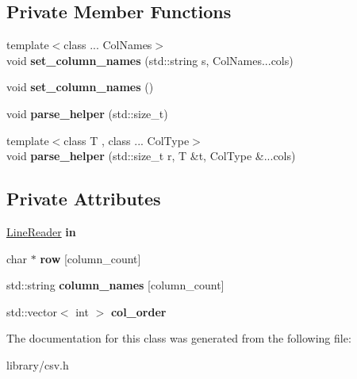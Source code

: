 \subsection*{Private Member Functions}
\begin{DoxyCompactItemize}
\item 
\mbox{\label{classio_1_1CSVReader_af0f3df423977925fd22acadbdbc4cdcd}} 
{\footnotesize template$<$class ... Col\+Names$>$ }\\void {\bfseries set\+\_\+column\+\_\+names} (std\+::string s, Col\+Names...\+cols)
\item 
\mbox{\label{classio_1_1CSVReader_a48a56e02ae597ae3506e1b24dc0718ef}} 
void {\bfseries set\+\_\+column\+\_\+names} ()
\item 
\mbox{\label{classio_1_1CSVReader_ada16395fbaedad5fcda248b50cd12da0}} 
void {\bfseries parse\+\_\+helper} (std\+::size\+\_\+t)
\item 
\mbox{\label{classio_1_1CSVReader_a6e2cb67ff14a62cee48fb9042c1bfff9}} 
{\footnotesize template$<$class T , class ... Col\+Type$>$ }\\void {\bfseries parse\+\_\+helper} (std\+::size\+\_\+t r, T \&t, Col\+Type \&...cols)
\end{DoxyCompactItemize}
\subsection*{Private Attributes}
\begin{DoxyCompactItemize}
\item 
\mbox{\label{classio_1_1CSVReader_a26da3892b5c4606617d9daadc0886501}} 
\hyperlink{classio_1_1LineReader}{Line\+Reader} {\bfseries in}
\item 
\mbox{\label{classio_1_1CSVReader_a48ab5773a4295f7969453838b4115e42}} 
char $\ast$ {\bfseries row} \mbox{[}column\+\_\+count\mbox{]}
\item 
\mbox{\label{classio_1_1CSVReader_a7b97f929cea543f83e61173ea435fdde}} 
std\+::string {\bfseries column\+\_\+names} \mbox{[}column\+\_\+count\mbox{]}
\item 
\mbox{\label{classio_1_1CSVReader_a1a59e51b74c2d6056821a5e499379884}} 
std\+::vector$<$ int $>$ {\bfseries col\+\_\+order}
\end{DoxyCompactItemize}


The documentation for this class was generated from the following file\+:\begin{DoxyCompactItemize}
\item 
library/csv.\+h\end{DoxyCompactItemize}
